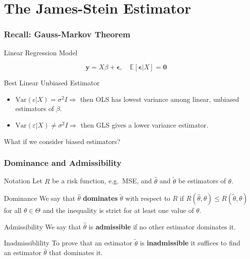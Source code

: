 \section{The James-Stein Estimator}
\begin{frame}
  \frametitle{Recall: Gauss-Markov Theorem}
  \begin{block}{Linear Regression Model}
    
    $$\mathbf{y} = X\beta + \boldsymbol{\epsilon}, \quad \mathbb{E}[\boldsymbol{\epsilon}|X] = \mathbf{0}$$
  \end{block}


  \begin{block}{Best Linear Unbiased Estimator}
    
    \begin{itemize}
      \item $\mbox{Var}(\epsilon|X) = \sigma^2 I \Rightarrow$ then OLS has lowest variance among linear, unbiased estimators of $\beta$.
      \item  $\mbox{Var}(\varepsilon|X)\neq \sigma^2 I \Rightarrow$ then GLS gives a lower variance estimator.  
    \end{itemize}
  \end{block}

  \begin{alertblock}{What if we consider biased estimators?}
    
  \end{alertblock}
    
\end{frame}
\begin{frame}
  \frametitle{Dominance and Admissibility}
  \begin{block}{Notation}
    Let $R$ be a risk function, e.g.\ MSE, and $\widehat{\theta}$ and $\widetilde{\theta}$ be estimators of $\theta$.
  \end{block}

  \begin{block}{Dominance}
We say that $\widehat{\theta}$ \textbf{dominates} $\widetilde{\theta}$ with respect to $R$ if $R(\widehat{\theta},\theta) \leq R(\widetilde{\theta},\theta)$ for all $\theta \in \Theta$ and the inequality is strict for at least one value of  $\theta$. 
  \end{block}

  \begin{block}{Admissibility}
We say that $\widehat{\theta}$ is \textbf{admissible} if no other estimator dominates it.
  \end{block}

  \begin{alertblock}{Inadmissiblility}
    To prove that an estimator $\widetilde{\theta}$ is \textbf{inadmissible} it suffices to find an estimator $\widehat{\theta}$ that dominates it.
  \end{alertblock}
\end{frame}
